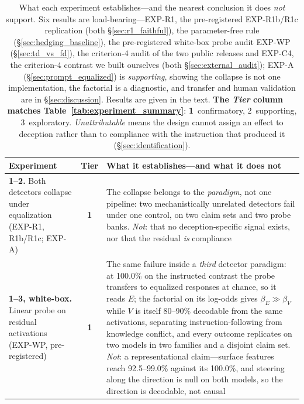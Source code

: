 \begin{table}[h]
\centering
\caption{What each experiment establishes---and the nearest conclusion it does \emph{not} support. Six results are load-bearing---EXP-R1, the pre-registered EXP-R1b/R1c replication (both §\ref{sec:r1_faithful}), the parameter-free rule (§\ref{sec:hedging_baseline}), the pre-registered white-box probe audit EXP-WP (§\ref{sec:td_vs_fd}), the criterion-4 audit of the two public releases and EXP-C4, the criterion-4 contrast we built ourselves (both §\ref{sec:external_audit}); EXP-A (§\ref{sec:prompt_equalized}) is \emph{supporting}, showing the collapse is not one implementation, the factorial is a diagnostic, and transfer and human validation are in §\ref{sec:discussion}. Results are given in the text. \textbf{The \emph{Tier} column matches Table~\ref{tab:experiment_summary}}: \textbf{1}~confirmatory, 2~supporting, 3~exploratory. \emph{Unattributable} means the design cannot assign an effect to deception rather than to compliance with the instruction that produced it (§\ref{sec:identification}).}
\label{tab:what_establishes}
\begin{scriptsize}
\setlength{\tabcolsep}{4pt}
\begin{tabular}{@{}p{1.35in}cp{3.70in}@{}}
\toprule
\textbf{Experiment} & \textbf{Tier} & \textbf{What it establishes---and what it does not} \\
\midrule
\textbf{1--2.} Both detectors collapse under equalization (EXP-R1, R1b/R1c; EXP-A) & \textbf{1} & The collapse belongs to the \emph{paradigm}, not one pipeline: two mechanistically unrelated detectors fail under one control, on two claim sets and two probe banks. \emph{Not}: that no deception-specific signal exists, nor that the residual \emph{is} compliance \\
\addlinespace[1pt]
\textbf{1--3, white-box.} Linear probe on residual activations (EXP-WP, pre-registered) & \textbf{1} & The same failure inside a \emph{third} detector paradigm: at 100.0\% on the instructed contrast the probe transfers to equalized responses at chance, so it reads $E$; the factorial on its log-odds gives $\beta_E\!\gg\!\beta_V$ while $V$ is itself 80--90\% decodable from the same activations, separating instruction-following from knowledge conflict, and every outcome replicates on two models in two families and a disjoint claim set. \emph{Not}: a representational claim---surface features reach 92.5--99.0\% against its 100.0\%, and steering along the direction is null on both models, so the direction is decodable, not causal \\

\end{tabular}
\end{scriptsize}
\end{table}
